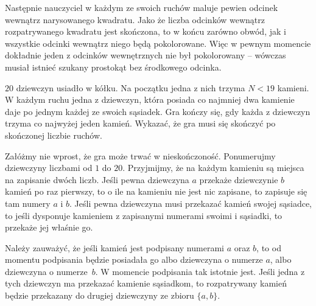 \begin{center}
\hspace{40px}
\end{center}

\vspace{10px}
\noindent
Następnie nauczyciel w każdym ze swoich ruchów maluje pewien odcinek wewnątrz narysowanego kwadratu. Jako że liczba odcinków wewnątrz rozpatrywanego kwadratu jest skończona, to w końcu zarówno obwód, jak i wszystkie odcinki wewnątrz niego będą pokolorowane. Więc w pewnym momencie dokładnie jeden z odcinków wewnętrznych nie był pokolorowany -- wówczas musiał istnieć szukany prostokąt bez środkowego odcinka.

\begin{problem}{6}
	$20$ dziewczyn usiadło w kółku. Na początku jedna z nich trzyma $N < 19$ kamieni. W każdym ruchu jedna z dziewczyn, która posiada co najmniej dwa kamienie daje po jednym każdej ze swoich sąsiadek. Gra kończy się, gdy każda z dziewczyn trzyma co najwyżej jeden kamień. Wykazać, że gra musi się skończyć po skończonej liczbie ruchów.
\end{problem}

\noindent
Załóżmy nie wprost, że gra może trwać w nieskończoność.
Ponumerujmy dziewczyny liczbami od $1$ do $20$.
Przyjmijmy, że na każdym kamieniu są miejsca na zapisanie dwóch liczb. Jeśli pewna dziewczyna $a$ przekaże dziewczynie $b$ kamień po raz pierwszy, to o ile na kamieniu nie jest nic zapisane, to zapisuje się tam numery $a$ i $b$. 
Jeśli pewna dziewczyna musi przekazać kamień swojej sąsiadce, to jeśli dysponuje kamieniem z zapisanymi numerami swoimi i sąsiadki, to przekaże jej właśnie go.

\vspace{10px}
\noindent
Należy zauważyć, że jeśli kamień jest podpisany numerami $a$ oraz $b$, to od momentu podpisania będzie posiadała go albo dziewczyna o numerze $a$, albo dziewczyna o numerze~$b$. W momencie podpisania tak istotnie jest. Jeśli jedna z tych dziewczyn ma przekazać kamienie sąsiadkom, to rozpatrywany kamień będzie przekazany do drugiej dziewczyny ze zbioru $\{a, b\}$.

